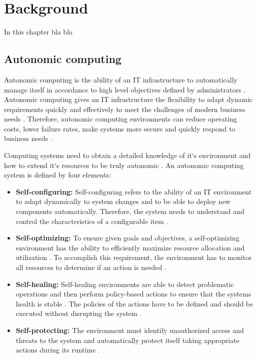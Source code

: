 \chapter{Background}
\label{sec:background}
%
In this chapter bla bla

\section{Autonomic computing}
Autonomic computing is the ability of an IT infrastructure to automatically manage itself in accordance to high level objectives defined by administrators \cite{Kephart2003VisionComputing}.
Autonomic computing gives an IT infrastructure the flexibility to adapt dynamic requirements quickly and effectively to meet the challenges of modern business needs \cite{Murch2004Autonomic}. Therefore, autonomic computing environments can reduce operating costs, lower failure rates, make systems more secure and quickly respond to business needs \cite{Jacob2004AutonomicSolution}.


Computing systems need to obtain a detailed knowledge of it`s environment and how to extend it`s resources to be truly autonomic \cite{Murch2004Autonomic}.
An autonomic computing system is defined by four elements:
\begin{itemize}
\item \textbf{Self-configuring:}
Self-configuring refers to the ability of an IT environment to adapt dynamically to system changes and to be able to deploy new components automatically. Therefore, the system needs to understand and control the characteristics of a configurable item \cite{Murch2004Autonomic, Kephart2003VisionComputing}.

\item \textbf{Self-optimizing:}
To ensure given goals and objectives, a self-optimizing environment has the ability to efficiently maximize resource allocation and utilization \cite{Jacob2004AutonomicSolution}. To accomplish this requirement, the environment has to monitor all resources to determine if an action is needed \cite{Murch2004Autonomic}.

\item \textbf{Self-healing:}
Self-healing environments are able to detect problematic operations and then perform policy-based actions to ensure that the systems health is stable \cite{Kephart2003VisionComputing, Jacob2004AutonomicSolution}. The policies of the actions have to be defined and should be executed without disrupting the system \cite{Kephart2003VisionComputing, Jacob2004AutonomicSolution}.

\item \textbf{Self-protecting:}
The environment must identify unauthorized access and threats to the system and automatically protect itself taking appropriate actions during its runtime \cite{Kephart2003VisionComputing, Jacob2004AutonomicSolution}.
\end{itemize}



